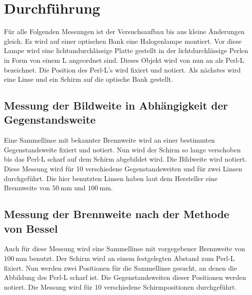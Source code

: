\section{Durchführung}
\label{sec:Durchführung}

Für alle Folgenden Messungen ist der Versuchsaufbau bis aus kleine Änderungen gleich.
Es wird auf einer optischen Bank eine Halogenlampe montiert.
Vor diese Lampe wird eine lichtundurchlässige Platte gestellt in der lichtdurchlässige Perlen in Form von einem L angeordnet sind.
Dieses Objekt wird von nun an als Perl-L bezeichnet.
Die Position des Perl-L's wird fixiert und notiert.
Als nächstes wird eine Linse und ein Schirm auf die optische Bank gestellt.

\subsection{Messung der Bildweite in Abhängigkeit der Gegenstandsweite}
\label{ssec:Durchführung_brennweite}

Eine Sammellinse mit bekannter Brennweite wird an einer bestimmten Gegenstandsweite fixiert und notiert.
Nun wird der Schirm so lange verschoben bis das Perl-L scharf auf dem Schirm abgebildet wird.
Die Bildweite wird notiert.
Diese Messung wird für 10 verschiedene Gegenstandsweiten und für zwei Linsen durchgeführt.
Die hier benutzten Linsen haben laut dem Hersteller eine Brennweite von $\SI{50}{\milli\metre}$ und $\SI{100}{\milli\metre}$.

\subsection{Messung der Brennweite nach der Methode von Bessel}
\label{ssec:Durchführung_bessel}

Auch für diese Messung wird eine Sammellinse mit vorgegebener Brennweite von $\SI{100}{\milli\metre}$ benutzt.
Der Schirm wird an einem festgelegten Abstand zum Perl-L fixiert.
Nun werden zwei Positionen für die Sammellinse gesucht, an denen die Abbildung des Perl-L scharf ist.
Die Gegenstandsweiten dieser Positionen werden notiert.
Die Messung wird für 10 verschiedene Schirmpositionen durchgeführt.